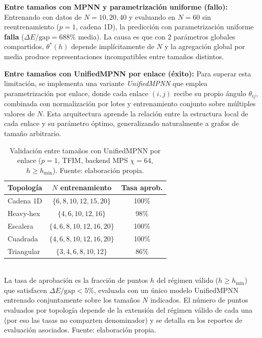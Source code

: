 \documentclass[11pt,a4paper,spanish]{book}
\begin{document}
\textbf{Entre tamaños con MPNN y parametrización uniforme (fallo):} Entrenando con datos de $N = 10, 20, 40$ y evaluando en $N = 60$ sin reentrenamiento ($p = 1$, cadena 1D), la predicción con parametrización uniforme \textbf{falla} ($\Delta E/\text{gap} = 688\%$ media). La causa es que con 2 parámetros globales compartidos, $\theta^*(h)$ depende implícitamente de $N$ y la agregación global por media produce representaciones incompatibles entre tamaños distintos.

\textbf{Entre tamaños con UnifiedMPNN por enlace (éxito):} Para superar esta limitación, se implementa una variante \emph{UnifiedMPNN} que emplea parametrización por enlace, donde cada enlace $(i,j)$ recibe su propio ángulo $\theta_{ij}$, combinada con normalización por lotes y entrenamiento conjunto sobre múltiples valores de $N$. Esta arquitectura aprende la relación entre la estructura local de cada enlace y su parámetro óptimo, generalizando naturalmente a grafos de tamaño arbitrario.

\begin{table}[H]
\centering
\caption[Validación entre tamaños con UnifiedMPNN por enlace]{Validación entre tamaños con UnifiedMPNN por enlace ($p = 1$, TFIM, backend MPS $\chi = 64$, $h \geq h_{\min}$). Fuente: elaboración propia.}
\label{tab:cross_n_transfer}
\begin{tabular}{lcc}
\toprule
\textbf{Topología} & \textbf{$N$ entrenamiento} & \textbf{Tasa aprob.} \\
\midrule
Cadena 1D & $\{6, 8, 10, 12, 15, 20\}$ & 100\% \\
Heavy-hex & $\{4, 6, 10, 12, 16\}$ & 98\% \\
Escalera & $\{4, 6, 8, 10, 12, 16, 20\}$ & 100\% \\
Cuadrada & $\{4, 6, 8, 10, 12, 16, 20\}$ & 100\% \\
Triangular & $\{3, 4, 6, 8, 10, 12\}$ & 86\% \\
\bottomrule
\end{tabular}
\\[2pt]
\footnotesize La tasa de aprobación es la fracción de puntos $h$ del régimen válido ($h \geq h_{\min}$) que satisfacen $\Delta E/\text{gap} < 5\%$, evaluada con un único modelo UnifiedMPNN entrenado conjuntamente sobre los tamaños $N$ indicados. El número de puntos evaluados por topología depende de la extensión del régimen válido de cada una (por eso las tasas no comparten denominador) y se detalla en los reportes de evaluación asociados. Fuente: elaboración propia.
\end{table}
\end{document}
